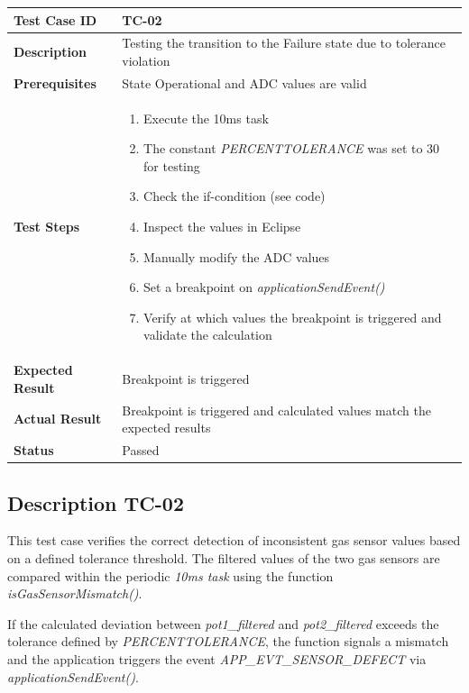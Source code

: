\begin{table}[h]
\centering
\begin{tabular}{|p{}|p{}|}
\hline
\textbf{Test Case ID} & TC-02 \\ \hline
\textbf{Description} & Testing the transition to the Failure state due to tolerance violation \\ \hline
\textbf{Prerequisites} & State Operational and ADC values are valid \\ \hline
\textbf{Test Steps} &
\begin{enumerate}
\item Execute the 10ms task
\item The constant \textit{PERCENTTOLERANCE} was set to 30 for testing
\item Check the if-condition (see code)
\item Inspect the values in Eclipse
\item Manually modify the ADC values
\item Set a breakpoint on \textit{applicationSendEvent()}
\item Verify at which values the breakpoint is triggered and validate the calculation
\end{enumerate}
\\ \hline
\textbf{Expected Result} & Breakpoint is triggered \\ \hline
\textbf{Actual Result} & Breakpoint is triggered and calculated values match the expected results \\ \hline
\textbf{Status} & \textcolor{green!60!black}{Passed} \\ \hline
\end{tabular}
\end{table}
\newpage
\subsection{Description TC-02}
This test case verifies the correct detection of inconsistent gas sensor values based on a defined tolerance threshold. 
The filtered values of the two gas sensors are compared within the periodic \textit{10ms task} using the function 
\textit{isGasSensorMismatch()}.

If the calculated deviation between \textit{pot1\_filtered} and \textit{pot2\_filtered} exceeds the tolerance defined by 
\textit{PERCENTTOLERANCE}, the function signals a mismatch and the application triggers the event 
\textit{APP\_EVT\_SENSOR\_DEFECT} via \textit{applicationSendEvent()}.

